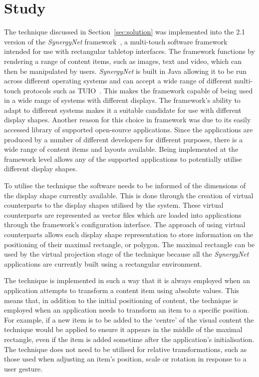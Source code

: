 \documentclass[review,5p,times,twocolumn]{elsarticle}
\begin{document}
\section{Study}
\label{sec:study}

The technique discussed in Section~\ref{sec:solution} was implemented into the 2.1 version of the {\emph{SynergyNet}} framework~\cite{McNaughton2017,AlAgha2010}, a multi-touch software framework intended for use with rectangular tabletop interfaces.
The framework functions by rendering a range of content items, such as images, text and video, which can then be manipulated by users.
{\emph{SynergyNet}} is built in Java allowing it to be run across different operating systems and can accept a wide range of different multi-touch protocols such as TUIO~\cite{Kaltenbrunner2007}.
This makes the framework capable of being used in a wide range of systems with different displays.
The framework's ability to adapt to different systems makes it a suitable candidate for use with different display shapes.
Another reason for this choice in framework was due to its easily accessed library of supported open-source applications.
Since the applications are produced by a number of different developers for different purposes, there is a wide range of content items and layouts available.
Being implemented at the framework level allows any of the supported applications to potentially utilise different display shapes.

To utilise the technique the software needs to be informed of the dimensions of the display shape currently available.
This is done through the creation of virtual counterparts to the display shapes utilised by the system.
These virtual counterparts are represented as vector files which are loaded into applications through the framework's configuration interface.
The approach of using virtual counterparts allows each display shape representation to store information on the positioning of their maximal rectangle, or polygon.
The maximal rectangle can be used by the virtual projection stage of the technique because all the {\emph{SynergyNet}} applications are currently built using a rectangular environment.

The technique is implemented in such a way that it is always employed when an application attempts to transform a content item using absolute values.
This means that, in addition to the initial positioning of content, the technique is employed when an application needs to transform an item to a specific position.
For example, if a new item is to be added to the `centre' of the visual content the technique would be applied to ensure it appears in the middle of the maximal rectangle, even if the item is added sometime after the application's initialisation.
The technique does not need to be utilised for relative transformations, such as those used when adjusting an item's position, scale or rotation in response to a user gesture.
\end{document}
